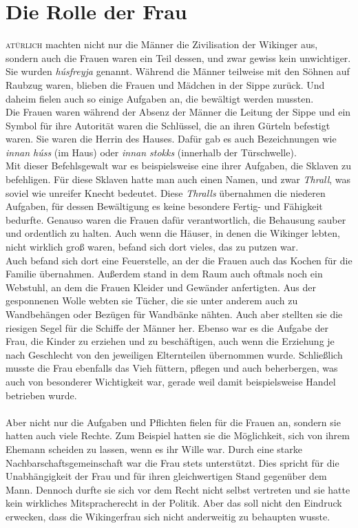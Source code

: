 \documentclass[12pt,a4paper,ngerman,openany]{book}
\newcommand{\flettrine}[2]{\lettrine[lines=2, depth=0, loversize=0.25, nindent=0.69pt, lraise=0.15]{\initfamily{#1}}{#2}}
\newcommand*\initfamily{\usefont{U}{GotIn}{xl}{n}}
\begin{document}
\section{Die Rolle der Frau}
\flettrine{N}{atürlich} machten nicht nur die Männer die Zivilisation der Wikinger aus, sondern auch die Frauen waren ein Teil dessen, und zwar gewiss kein unwichtiger. Sie wurden \textit{húsfreyja} genannt. Während die Männer teilweise mit den Söhnen auf Raubzug waren, blieben die Frauen und Mädchen in der Sippe zurück. Und daheim fielen auch so einige Aufgaben an, die bewältigt werden mussten.\\
Die Frauen waren während der Absenz der Männer die Leitung der Sippe und ein Symbol für ihre Autorität waren die Schlüssel, die an ihren Gürteln befestigt waren. Sie waren die Herrin des Hauses. Dafür gab es auch Bezeichnungen wie \textit{innan húss} (im Haus) oder \textit{innan stokks} (innerhalb der Türschwelle).\\
Mit dieser Befehlsgewalt war es beispielsweise eine ihrer Aufgaben, die Sklaven zu befehligen. Für diese Sklaven hatte man auch einen Namen, und zwar \textit{Thrall}, was soviel wie \glqq unreifer Knecht\grqq{} bedeutet. Diese \textit{Thralls} übernahmen die niederen Aufgaben, für dessen Bewältigung es keine besondere Fertig- und Fähigkeit bedurfte. 
Genauso waren die Frauen dafür verantwortlich, die Behausung sauber und ordentlich zu halten. Auch wenn die Häuser, in denen die Wikinger lebten, nicht wirklich groß waren,
befand sich dort vieles, das zu putzen war.\\
Auch befand sich dort eine Feuerstelle, an der die Frauen auch das Kochen für die Familie übernahmen. Außerdem stand in dem Raum auch oftmals noch ein Webstuhl, an dem die Frauen Kleider und Gewänder anfertigten. Aus der gesponnenen Wolle webten sie Tücher, die sie unter anderem auch zu Wandbehängen oder Bezügen für Wandbänke nähten. Auch aber stellten sie die riesigen Segel für die Schiffe der Männer her.
Ebenso war es die Aufgabe der Frau, die Kinder zu erziehen und zu beschäftigen, auch wenn die Erziehung je nach Geschlecht von den jeweiligen Elternteilen übernommen wurde.
Schließlich musste die Frau ebenfalls das Vieh füttern, pflegen und auch beherbergen, was auch von besonderer Wichtigkeit war, gerade weil damit beispielsweise Handel betrieben wurde.\\\\
Aber nicht nur die Aufgaben und Pflichten fielen für die Frauen an, sondern sie hatten auch viele Rechte. Zum Beispiel hatten sie die Möglichkeit, sich von ihrem Ehemann scheiden zu lassen, wenn es ihr Wille war. Durch eine starke Nachbarschaftsgemeinschaft war die Frau stets unterstützt. Dies spricht für die Unabhängigkeit der Frau und für ihren gleichwertigen Stand gegenüber dem Mann. Dennoch durfte sie sich vor dem Recht nicht selbst vertreten und sie hatte kein wirkliches Mitspracherecht in der Politik. Aber das soll nicht den Eindruck erwecken, dass die Wikingerfrau sich nicht anderweitig zu behaupten wusste.\\
\end{document}
